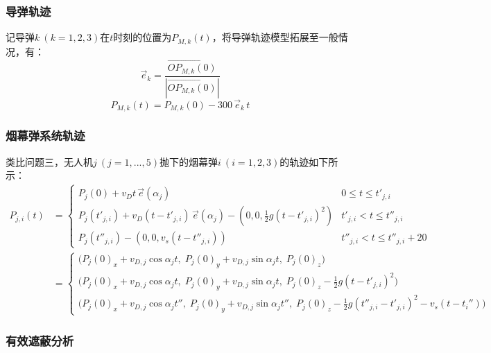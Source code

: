 \documentclass[withoutpreface,bwprint]{cumcmthesis}
\numberwithin{equation}{section} %
\numberwithin{figure}{section} %
\numberwithin{table}{section}  %
\begin{document}
\subsubsection{导弹轨迹}

记导弹$k~(k=1,2,3)$在$t$时刻的位置为$P_{M,k}(t)$，将导弹轨迹模型拓展至一般情况，有：
\begin{equation}
\vec{e}_k = \frac{\overrightarrow{OP_{M,k}(0)}}{\left\lvert \overrightarrow{OP_{M,k}(0)} \right\rvert}
\end{equation}
\begin{equation}
P_{M,k}(t) = P_{M,k}(0) - 300\,\vec{e}_{k}\, t
\end{equation}

\vspace{-1em}
\subsubsection{烟幕弹系统轨迹}
类比问题三，无人机$j~(j=1,...,5)$抛下的烟幕弹$i~(i=1,2,3)$的轨迹如下所示：
\begin{equation}
\begin{aligned}
P_{j,i}(t) &= 
\begin{cases}
P_{j}(0) + v_D t\, \vec{e}(\alpha_j) & 0 \le t \le t'_{j,i} \\
P_{j}(t'_{j,i}) + v_D (t - t'_{j,i})\, \vec{e}(\alpha_j) - (0, 0, \tfrac{1}{2}g(t - t'_{j,i})^2) & t'_{j,i} < t \le t''_{j,i} \\
P_{j}(t''_{j,i}) - (0, 0, v_s(t - t''_{j,i})) & t''_{j,i} < t \le t''_{j,i} + 20
\end{cases}
\\[2ex]
&= 
\begin{cases}
\bigl(P_{j}(0)_x + v_{D,j} \cos{\alpha_j} t,\; P_{j}(0)_y + v_{D,j} \sin{\alpha_j} t,\; P_{j}(0)_z\bigr) & \\[0.3ex]
\bigl(P_{j}(0)_x\!+\!v_{D,j} \cos{\alpha_j} t,\; P_{j}(0)_y\!+\!v_{D,j} \sin{\alpha_j} t,\; P_{j}(0)_z\!-\!\tfrac{1}{2}g(t\!-\!t'_{j,i})^2\bigr) & \\[0.3ex]
\bigl(P_{j}(0)_x\!+\!v_{D,j} \cos{\alpha_j} t'',\; P_{j}(0)_y\!+\!v_{D,j} \sin{\alpha_j} t'',\; P_{j}(0)_z\!-\!\tfrac{1}{2}g(t''_{j,i}\!-\!t'_{j,i})^2\!-\!v_s(t\!-\!t_i'')\bigr) &
\end{cases}
\end{aligned}
\end{equation}
\vspace{-1em}
\subsubsection{有效遮蔽分析}
\end{document}
